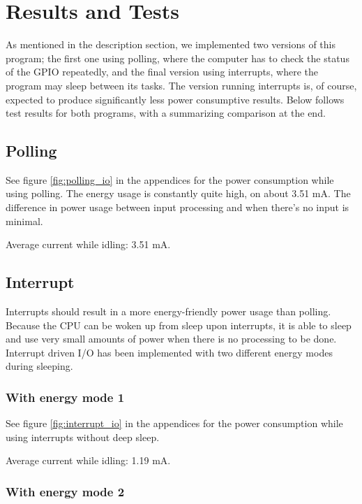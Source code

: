 \section{Results and Tests}

As mentioned in the description section, we implemented two versions of this program; the first one using polling, where the computer has to check the status of the GPIO repeatedly, and the final version using interrupts, where the program may sleep between its tasks. The version running interrupts is, of course, expected to produce significantly less power consumptive results. Below follows test results for both programs, with a summarizing comparison at the end.

\subsection{Polling}

See figure \ref{fig:polling_io} in the appendices for the power consumption while using polling. The energy usage is constantly quite high, on about 3.51 mA. The difference in power usage between input processing and when there's no input is minimal.

Average current while idling: 3.51 mA.

\subsection{Interrupt}

Interrupts should result in a more energy-friendly power usage than polling.
Because the CPU can be woken up from sleep upon interrupts, it is able to sleep and use very small amounts of power when there is no processing to be done. Interrupt driven I/O has been implemented with two different energy modes during sleeping.

\subsubsection{With energy mode 1}

See figure \ref{fig:interrupt_io} in the appendices for the power consumption while using interrupts without deep sleep.

Average current while idling: 1.19 mA.

\subsubsection{With energy mode 2}

